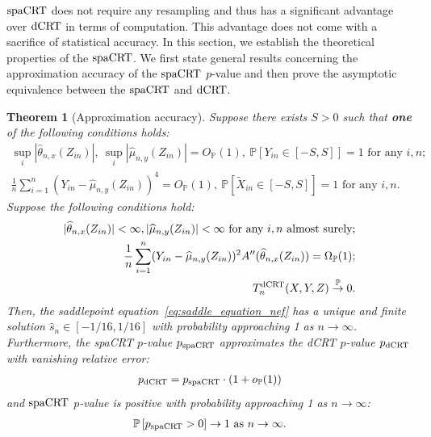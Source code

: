 \documentclass[12pt]{article}
\newtheorem{theorem}{Theorem}
\theoremstyle{definition}
\def\P{\mathbb{P}}
\def\P{\mathbb{P}}
\renewcommand{\P}{\mathbb{P}}							%
\newcommand{\convp}{\overset{\mathbb{P}}{\rightarrow}}             %
\newcommand{\srx}{X}									%
\newcommand{\srz}{Z}									%
\newcommand{\srxk}{\widetilde X}						%
\newcommand{\sry}{Y}									%
\newcommand{\dCRT}{\textnormal{dCRT}} 					%
\newcommand{\spacrt}{\textnormal{spaCRT}}               %
\begin{document}
$\spacrt$ does not require any resampling and thus has a significant advantage over $\dCRT$ in terms of computation. This advantage does not come with a sacrifice of statistical accuracy. In this section, we establish the theoretical properties of the $\spacrt$. We first state general results concerning the approximation accuracy of the $\spacrt$ $p$-value and then prove the asymptotic equivalence between the $\spacrt$ and $\dCRT$.

\begin{theorem}[Approximation accuracy]\label{thm:validity_spacrt}
  Suppose there exists $S>0$ such that \textbf{one} of the following conditions holds:
  \begin{align}
    \sup_{i}|\widehat{\theta}_{n,x}(\srz_{in})|,\ \sup_{i}|\widehat{\mu}_{n,y}(\srz_{in})| = O_{\P}(1),\  \P[\sry_{in}\in [-S,S]]=1\text{ for any }i,n\label{eq:cse_assumption}\tag{CSE};\\
    \frac{1}{n}\sum_{i=1}^n (\sry_{in}-\widehat{\mu}_{n,y}(\srz_{in}))^4=O_{\P}(1),\ \P\left[\srxk_{in}\in [-S,S]\right]=1\text{ for any }i,n\label{eq:ccs_assumption}\tag{CCS}.
  \end{align}
	Suppose the following conditions hold:
	\begin{align}
		|\widehat \theta_{n,x}(\srz_{in})|<\infty,|\widehat \mu_{n,y}(\srz_{in})|<\infty\text{ for any $i,n$ almost surely};\label{eq:upper_bound_theta_a} \\
		\frac{1}{n}\sum_{i=1}^n (Y_{in}-\widehat{\mu}_{n,y}(Z_{in}))^2 A''(\widehat \theta_{n,x}(\srz_{in}))=\Omega_{\P}(1);\label{eq:lower_bound_spacrt}\\
		T_n^{\dCRT}(\srx,\sry,\srz)\convp 0\label{eq:x_n_convergence_spacrt}.
	\end{align}
	Then, the saddlepoint equation~\eqref{eq:saddle_equation_nef} has a unique and finite solution $\hat s_n \in [-1/16, 1/16]$ with probability approaching 1 as $n \rightarrow \infty$. Furthermore, the spaCRT $p$-value $p_{\spacrt}$ approximates the dCRT $p$-value $p_{\dCRT}$ with vanishing relative error:
	\begin{align}\label{eq:approximation_accuracy_spacrt}
		p_{\dCRT} = p_{\spacrt}\cdot (1+o_\P(1))
	\end{align}
  and $\spacrt$ $p$-value is positive with probability approaching 1 as $n\rightarrow\infty$:
  \begin{align}\label{eq:spacrt_pvalue_positivity}
    \P\left[p_{\spacrt}>0\right]\rightarrow1 \text{ as }n\rightarrow\infty.
  \end{align}
\end{theorem}
\end{document}
